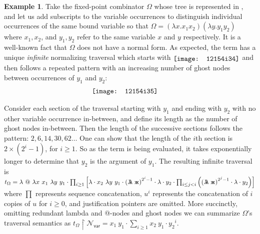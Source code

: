 \documentclass[xchauthor,chkrefs,GCNS,amsmath,amsthm,rotating,leaveRGB]{tcsg}
\theoremstyle{plain}
\theoremstyle{definition}
\newtheorem{example}{Example}[section]
\newcommand{\ghostlmd}{{\lambda\mkern-7mu \lambda}}
\newcommand{\ghostvar}{\mathsf{x\mkern-5mu x}}
\begin{document}
\begin{example}
Take the fixed-point combinator $\Omega $ whose tree is represented in
, and let us add subscripts to the
variable occurrences to distinguish individual occurrences of the same bound
variable so that  $\Omega = (\lambda x. x_{1} x_{2}) (\lambda y. y_{1}
y_{2})$ where $x_{1},x_{2}$, and $y_{1},y_{2}$ refer to the same variable $x$
and $y$ respectively. It is a well-known fact that $\Omega $ does not have a
normal form. As expected, the term has a unique \emph{infinite} normalizing
traversal which starts with $\raisebox{-2pt}{\texttt{[image: 12154i34]}}$ and then follows a
repeated pattern with an increasing number of ghost nodes between occurrences
of $y_{1}$ and $y_{2}$:
%
\begin{eqnarray*}
\hspace{-0.5cm}\texttt{[image: 12154i35]}
\end{eqnarray*}

Consider each section of the traversal starting with $y_{1}$ and ending with
$y_{2}$ with no other variable occurrence in-between, and define its length
as the number of ghost nodes in-between. Then the length of the successive
sections follows the pattern: $2,6,14,30,62\ldots $ One can show that the
length of the $i$th section is $2\times (2^{i}-1)$, for $i\geq 1$. So as the
term is being evaluated, it takes exponentially longer to determine that
$y_{2}$ is the argument of $y_{1}$. The resulting infinite traversal is
$t_\Omega = \lambda ~ @ ~ \lambda x ~  x_{1} ~ \lambda y ~ y_{1} \cdot  \prod
_{i\geq 1} \left [ \lambda \cdot x_{2} ~ \lambda y ~ y_{1} \cdot
{({\ghostlmd}\ \mathsf {\ghostvar})}^{2^{i} -1}\cdot \lambda \cdot y_{2}
\cdot \prod _{i\leq j<i} \left ( {({\ghostlmd }\ \mathsf
{\ghostvar})}^{2^{j} -1} \cdot \lambda \cdot y_{2} \right ) \right ] $
where $\prod $ represents sequence concatenation, $u^{i}$ represents the
concatenation of $i$ copies of $u$ for $i\geq 0$, and justification pointers
are omitted. More succinctly, omitting redundant lambda and @-nodes and ghost
nodes we can summarize $\Omega $'s traversal semantics as $t_\Omega
\upharpoonright  \mathcal {N}_{\mathsf{var}}=  x_{1} ~ y_{1} \cdot  \sum
_{i\geq 1} x_{2} ~ y_{1} \cdot {y_{2}}^{i}$.
\end{example}
\end{document}
